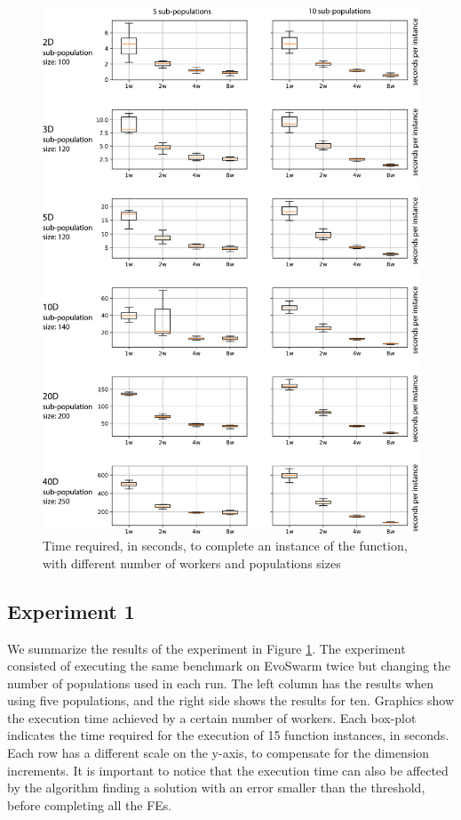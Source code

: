 \documentclass[review]{elsarticle}
\begin{document}
\begin{figure}[ht]
    \centering
    \includegraphics[width=\textwidth]{sp_size_worker}
    \caption{Time required, in seconds, to complete an instance of the function, with different number of workers and populations sizes }
    \label{fig:spworker}
\end{figure}


\subsection{Experiment 1}
\label{sec:exp1results}

We summarize the results of the experiment in Figure \ref{fig:spworker}.  The
experiment consisted of executing the same benchmark on EvoSwarm twice but
changing the number of populations used in each run. The left column has the
results when using five populations, and the right side shows the results for
ten.  Graphics show the execution time achieved by a certain number of workers.
Each box-plot indicates the time required for the execution of 15  function
instances, in seconds.  Each row has a different scale on the y-axis, to
compensate for the dimension increments. It is important to notice that the
execution time can also be affected by the algorithm finding a solution with an
error smaller than the threshold, before completing all the FEs.
\end{document}
